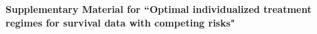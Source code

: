 \documentclass[12pt]{article}
\theoremstyle{plain} %
\begin{document}



\newpage
  \bigskip
  \bigskip
  \bigskip
  \begin{center}
    {\LARGE\bf Supplementary Material for ``Optimal individualized treatment regimes for survival data with competing risks"}
\end{center}
  \medskip

\setcounter{section}{0}

\setcounter{table}{0}
\renewcommand{\thetable}{S\arabic{table}}

\setcounter{figure}{0}
\renewcommand{\thefigure}{S\arabic{figure}}

\renewcommand{\thesection}{\Alph{section}}

\setcounter{algorithm}{0}
\renewcommand{\thealgorithm}{S\arabic{algorithm}}

\setcounter{equation}{0}
\renewcommand{\theequation}{S\arabic{equation}}


\end{document}
